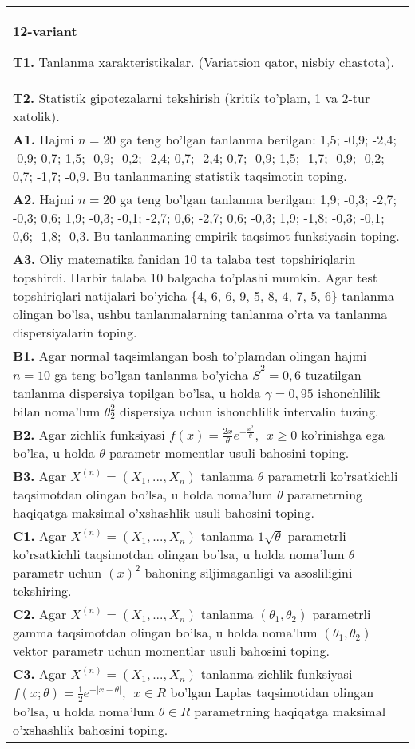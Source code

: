 \documentclass{article}
\begin{document}
\begin{tabular}{m{17cm}}
\textbf{12-variant}
\newline

\textbf{T1.} 
Tanlanma xarakteristikalar. (Variatsion qator, nisbiy chastota).
\\
\textbf{T2.} 
Statistik gipotezalarni tekshirish (kritik to'plam, 1 va 2-tur xatolik).
\\
\textbf{A1.} 
Hajmi \(n = 20\) ga teng bo'lgan tanlanma berilgan: 1,5; -0,9; -2,4; -0,9; 0,7; 1,5; -0,9; -0,2; -2,4; 0,7; -2,4; 0,7; -0,9; 1,5; -1,7; -0,9; -0,2; 0,7; -1,7; -0,9. Bu tanlanmaning statistik taqsimotin toping.
\\
\textbf{A2.} 
Hajmi \(n = 20\) ga teng bo'lgan tanlanma berilgan: 1,9; -0,3; -2,7; -0,3; 0,6; 1,9; -0,3; -0,1; -2,7; 0,6; -2,7; 0,6; -0,3; 1,9; -1,8; -0,3; -0,1; 0,6; -1,8; -0,3. Bu tanlanmaning empirik taqsimot funksiyasin toping.
\\
\textbf{A3.} 
Oliy matematika fanidan 10 ta talaba test topshiriqlarin topshirdi. Harbir talaba 10 balgacha to'plashi mumkin. Agar test topshiriqlari natijalari bo'yicha \{4, 6, 6, 9, 5, 8, 4, 7, 5, 6\} tanlanma olingan bo'lsa, ushbu tanlanmalarning tanlanma o'rta va tanlanma dispersiyalarin toping.
\\
\textbf{B1.} 
Agar normal taqsimlangan bosh to'plamdan olingan hajmi \(n = 10\) ga teng bo'lgan tanlanma bo'yicha \({\overline{S}}^{2} = 0,6\) tuzatilgan tanlanma dispersiya topilgan bo'lsa, u holda \(\gamma = 0,95\) ishonchlilik bilan noma'lum \(\theta_{2}^{2}\) dispersiya uchun ishonchlilik intervalin tuzing.
\\
\textbf{B2.} 
Agar zichlik funksiyasi \(f(x) = \frac{2x}{\theta}e^{- \frac{x^{2}}{\theta}},\ \ x \geq 0\) ko'rinishga ega bo'lsa, u holda \(\theta\) parametr momentlar usuli bahosini toping.
\\
\textbf{B3.} 
Agar \(X^{(n)} = \left( X_{1},...,X_{n} \right)\) tanlanma \(\theta\) parametrli ko'rsatkichli taqsimotdan olingan bo'lsa, u holda noma'lum \(\theta\) parametrning haqiqatga maksimal o'xshashlik usuli bahosini toping.
\\
\textbf{C1.} 
Agar \(X^{(n)} = \left( X_{1},...,X_{n} \right)\) tanlanma \(1\sqrt{\theta}\) parametrli ko'rsatkichli taqsimotdan olingan bo'lsa, u holda noma'lum \(\theta\) parametr uchun \((\overline{x})^{2}\) bahoning siljimaganligi va asosliligini tekshiring.
\\
\textbf{C2.} 
Agar \(X^{(n)} = \left( X_{1},...,X_{n} \right)\) tanlanma \(\left( \theta_{1},\theta_{2} \right)\) parametrli gamma taqsimotdan olingan bo'lsa, u holda noma'lum \(\left( \theta_{1},\theta_{2} \right)\) vektor parametr uchun momentlar usuli bahosini toping.
\\
\textbf{C3.} 
Agar \(X^{(n)} = \left( X_{1},...,X_{n} \right)\) tanlanma zichlik funksiyasi\(f(x;\theta) = \frac{1}{2}e^{- |x - \theta|},\ \ x \in R\) bo'lgan Laplas taqsimotidan olingan bo'lsa, u holda noma'lum \(\theta \in R\) parametrning haqiqatga maksimal o'xshashlik bahosini toping.
\\

\end{tabular}
\vspace{1cm}
\end{document}
